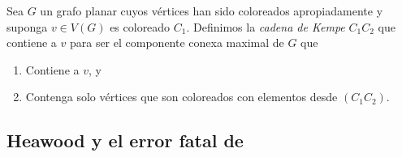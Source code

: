 \documentclass[
	3p,
	times,
	a4paper,
	authoryear
]{elsarticle}%
\begin{document}
\begin{definition}

Sea $G$ un grafo planar cuyos vértices han sido coloreados apropiadamente y suponga $v\in V(G)$ es coloreado $C_1$. Definimos la \emph{cadena de Kempe} $C_1C_2$ que contiene a $v$ para ser el componente conexa maximal de $G$ que
	
\begin{enumerate}%

	\item Contiene a $v$, y

	\item Contenga solo vértices que son coloreados con elementos desde $(C_1C_2)$.

\end{enumerate}
	
\end{definition}

\subsection{Heawood y el error fatal de \citeauthor{kempe}}\label{sec:3.3}



%
%

\end{document}
